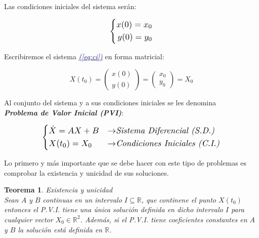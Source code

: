 \documentclass[12pt,a4paper]{report} %
\newtheorem{theorem}{Teorema}[chapter]
\newcommand{\eref}[1]{\hyperref[#1]{\textcolor{blue}{\textit{(\ref*{#1})}}}}
\begin{document}
		\vspace{0.5cm}\noindent Las condiciones iniciales del sistema serán:
	
	\begin{equation}
		\label{eq:ci}
		\scalebox{1.2}{$\displaystyle
			\left\{
			\begin{aligned}
				x(0)=x_0 \\
			    y(0)=y_0
			\end{aligned}
			\right.
			$}
	\end{equation}\smallskip
	
	\vspace{0.5cm}\noindent Escribiremos el sistema \eref{eq:ci} en forma matricial:
	
	\begin{equation}
		\label{cimat}
		X(t_0)=\begin{pmatrix}
			x(0)\\y(0)
		\end{pmatrix}=\begin{pmatrix}
		x_0\\y_0
		\end{pmatrix}=X_0
	\end{equation}\smallskip
	
	\vspace{0.5cm}\noindent Al conjunto del sistema y a sus condiciones iniciales se les denomina \\ \textbf{\textit{Problema de Valor Inicial (PVI)}}: 
	
	\begin{equation}
	\label{eq:pvi}
	\scalebox{1.2}{$\displaystyle
		\left\{
		\begin{aligned}
			&\dot{X}=AX+B &\rightarrow& \textit{Sistema Diferencial (S.D.)}\\
			&X(t_0)=X_0 &\rightarrow& \textit{Condiciones Iniciales (C.I.)}
		\end{aligned}
		\right.
		$}
    \end{equation}\smallskip
	
	\vspace{0.5cm}\noindent Lo primero y más importante que se debe hacer con este tipo de problemas es comprobar la existencia y unicidad de sus soluciones.
	
	\begin{theorem}\label{thm:interesante}
		Existencia y unicidad \\[2mm]
		\textit{Sean $A$ y $B$ continuas en un intervalo $I\subseteq  \mathbb{R}$, que continene el punto $X(t_0)$ entonces el P.V.I. tiene una única solución definida en dicho intervalo $I$ para cualquier vector $X_0 \in \mathbb{R}^2$}. Además, si el P.V.I. tiene coeficientes constantes en $A$ y $B$ la solución está definida en $\mathbb{R}$.
	\end{theorem}
	\vspace{4mm}
	
\end{document}
